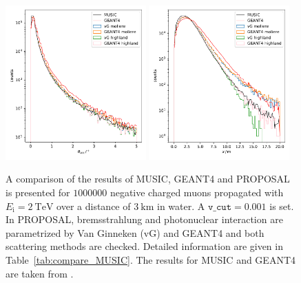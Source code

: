 \begin{figure}
    \centering
        {\includegraphics[width=0.48\textwidth]{../../deflection/plots/FINAL/2TeV_1e6events_accumulated_defl_only3km_5deg_paper.pdf}}
        {\includegraphics[width=0.48\textwidth]{../../deflection/plots/FINAL/2TeV_1e6events_distance_showeraxis_only3km_20m_paper.pdf}}
    \caption{A comparison of the results of MUSIC, GEANT4 and PROPOSAL is presented for $\num{1000000}$ negative charged muons propagated with 
    $E_{\text{i}} = \SI{2}{\tera\electronvolt}$ over a distance of 
    $\SI{3}{\kilo\meter}$ in water. A $\texttt{v\_cut} = 0.001$ is set. In PROPOSAL, 
    bremsstrahlung and photonuclear interaction are parametrized by 
    Van Ginneken (vG) and GEANT4 and both scattering methods are checked. Detailed information are given in 
    Table~\ref{tab:compare_MUSIC}. The results for MUSIC and GEANT4 are taken from 
    \cite{comparison_MUSIC_GEANT4_2009}.}
    \label{fig:compare_MUSIC}
\end{figure}



